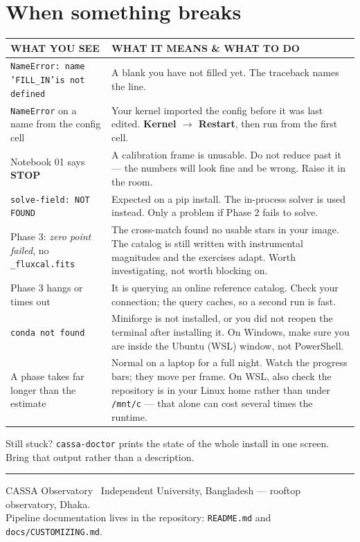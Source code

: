 \documentclass[11pt,a4paper]{article}
\newcommand{\cm}[1]{\texttt{\small #1}}
\newcommand{\thead}[1]{{\sffamily\bfseries\scriptsize\color{inkfaint}\MakeUppercase{#1}}}
\begin{document}
\section{When something breaks}
\begin{longtable}{@{}p{5.6cm}p{9.2cm}@{}}
\toprule
\thead{What you see} & \thead{What it means \& what to do} \\
\midrule
\endhead
\cm{NameError: name 'FILL\_IN'\newline is not defined} &
A blank you have not filled yet. The traceback names the line. \\
\cm{NameError} on a name from the config cell &
Your kernel imported the config before it was last edited. \textbf{Kernel $\rightarrow$
Restart}, then run from the first cell. \\
Notebook 01 says \textbf{STOP} &
A calibration frame is unusable. Do not reduce past it --- the numbers will look fine and be
wrong. Raise it in the room. \\
\cm{solve-field: NOT FOUND} &
Expected on a pip install. The in-process solver is used instead. Only a problem if Phase 2
fails to solve. \\
Phase 3: \emph{zero point failed}, no \cm{\_fluxcal.fits} &
The cross-match found no usable stars in your image. The catalog is still written with
instrumental magnitudes and the exercises adapt. Worth investigating, not worth blocking on. \\
Phase 3 hangs or times out &
It is querying an online reference catalog. Check your connection; the query caches, so a
second run is fast. \\
\cm{conda not found} &
Miniforge is not installed, or you did not reopen the terminal after installing it. On Windows,
make sure you are inside the Ubuntu (WSL) window, not PowerShell. \\
A phase takes far longer than the estimate &
Normal on a laptop for a full night. Watch the progress bars; they move per frame. On WSL,
also check the repository is in your Linux home rather than under \cm{/mnt/c} --- that alone
can cost several times the runtime. \\
\bottomrule
\end{longtable}

Still stuck? \cm{cassa-doctor} prints the state of the whole install in one screen. Bring that
output rather than a description.

\vspace{18pt}
{\color{rule}\hrule}
\vspace{8pt}
{\sffamily\scriptsize\color{inkfaint}
CASSA Observatory \textbullet\ Independent University, Bangladesh --- rooftop observatory,
Dhaka.\\
Pipeline documentation lives in the repository: \texttt{README.md} and
\texttt{docs/CUSTOMIZING.md}.}
\end{document}
